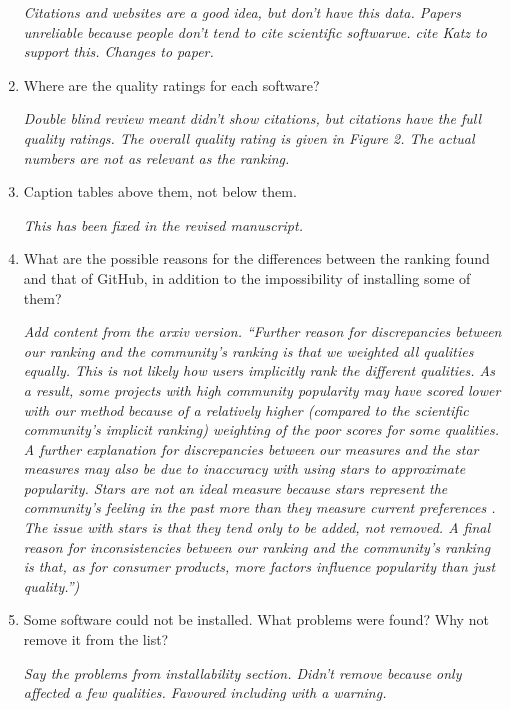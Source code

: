 \documentclass[12pt]{casletter}
\begin{document}
\begin{letter}
\begin{enumerate}
  \emph{Citations and websites are a good idea, but don't have this data.
  Papers unreliable because people don't tend to cite scientific softwarwe.
  cite Katz to support this.  Changes to paper.\smallskip}

  \item Where are the quality ratings for each software? \medskip

  \emph{Double blind review meant didn't show citations, but citations have the
  full quality ratings.  The overall quality rating is given in Figure 2. The
  actual numbers are not as relevant as the ranking. \smallskip}

  \item Caption tables above them, not below them. \medskip

  \emph{This has been fixed in the revised manuscript.  \smallskip}

  \item What are the possible reasons for the differences between the ranking
  found and that of GitHub, in addition to the impossibility of installing some
  of them? \medskip

  \emph{Add content from the arxiv version.  ``Further reason for discrepancies
  between our ranking and the community's ranking is that we weighted all
  qualities equally. This is not likely how users implicitly rank the different
  qualities. As a result, some projects with high community popularity may have
  scored lower with our method because of a relatively higher (compared to the
  scientific community's implicit ranking) weighting of the poor scores for some
  qualities. A further explanation for discrepancies between our measures and
  the star measures may also be due to inaccuracy with using stars to
  approximate popularity.  Stars are not an ideal measure because stars
  represent the community's feeling in the past more than they measure current
  preferences \citep{Szulik2017}.  The issue with stars is that they tend only
  to be added, not removed.  A final reason for inconsistencies between our
  ranking and the community's ranking is that, as for consumer products, more
  factors influence popularity than just quality.'')\smallskip}

  \item Some software could not be installed. What problems were found? Why not
  remove it from the list? \medskip

  \emph{Say the problems from installability section.  Didn't remove because
  only affected a few qualities.  Favoured including with a warning.
  \smallskip}


\end{enumerate}
\end{letter}
\end{document}
